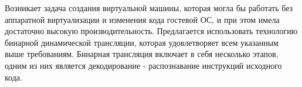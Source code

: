 Возникает задача создания виртуальной машины, которая могла бы работать без аппаратной виртуализации и изменения кода гостевой ОС, и при этом имела достаточно высокую производительность. Предлагается использовать технологию бинарной динамической трансляции, которая удовлетворяет всем указанным выше требованиям. Бинарная трансляция включает в себя несколько этапов, одним из них является декодирование - распознавание инструкций исходного кода.

